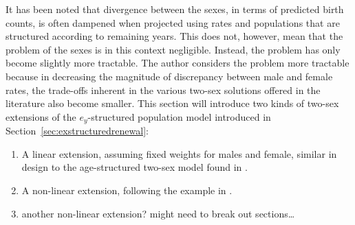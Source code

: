  \FloatBarrier
{}

It has been noted that divergence between the sexes, in terms of predicted birth
counts, is often dampened when projected using rates and populations that are
structured according to remaining years. This does not, however, mean that the
problem of the sexes is in this context negligible. Instead, the problem has
only become slightly more tractable. The author considers the problem more
tractable because in decreasing the magnitude of discrepancy between male and female
rates, the trade-offs inherent in the various two-sex solutions offered in the
literature also become smaller. This section will introduce two kinds of two-sex
extensions of the $e_y$-structured population model introduced in
Section~\ref{sec:exstructuredrenewal}:
\begin{enumerate}
  \item A linear extension, assuming fixed weights for males and female,
  similar in design to the age-structured two-sex model found in
  \citet{goodman1967age}.
  \item A non-linear extension, following the example in
  \citet{gupta1978alternative}.
  \item another non-linear extension? might need to break out sections\ldots
\end{enumerate}